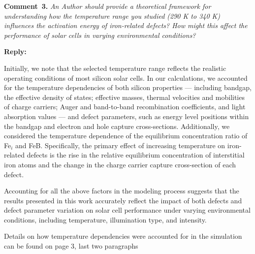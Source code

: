\documentclass[a4paper,fleqn]{cas-sc}
\begin{document}


\vspace{1cm}
\noindent
\textcolor[rgb]{0.00,0.50,1.00}{\textbf{Comment~3.}}
\emph{An Author should provide a theoretical framework for understanding how the temperature range you studied (290 K to 340 K) influences the activation
energy of iron-related defects? How might this affect the performance of solar cells in varying environmental conditions?}





\noindent
\textcolor[rgb]{0.51,0.00,0.00}{\textbf{Reply:}}

Initially, we note that the selected temperature range reflects the
realistic operating conditions of most silicon solar cells.
In our calculations, we accounted for the temperature dependencies of both silicon properties ---
including bandgap, the effective density of states; effective masses, thermal velocities and mobilities of charge carriers;
Auger and band-to-band recombination coefficients, and light absorption values ---
and defect parameters, such as energy level positions within the bandgap and electron and hole capture cross-sections.
Additionally, we considered the temperature dependence of the equilibrium concentration ratio of Fe$_i$ and FeB.
Specifically, the primary effect of increasing temperature on iron-related defects is the rise in the relative equilibrium
concentration of interstitial iron atoms
and the change in the charge carrier capture cross-section of each defect.

Accounting for all the above factors in the modeling process suggests that
the results presented in this work accurately reflect the impact of both defects
and defect parameter variation on solar cell performance under varying environmental conditions,
including temperature,  illumination type, and intensity.

Details on how temperature dependencies were accounted for in the simulation can be found on page 3, last two paragraphs
\end{document}
